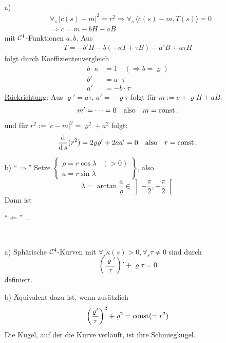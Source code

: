 \begin{beweis} \(\)
 \begin{enumerate}
  \item[a)] 
  \begin{align*}
  &\forall_s \, |c(s) - m|^2 = r^2 \Rightarrow \forall_s \, \langle c(s) - m, T(s) \rangle = 0 \\
  &\Rightarrow c = m - b H - a B
  \end{align*}
  mit \(\mathcal{C}^1\)-Funktionen \(a, b\). Aus
  \begin{align*}
   T = -b' H - b (-\kappa T + \tau B) - a' B + a \tau H
  \end{align*}
  folgt durch Koeffizientenvergleich
  \begin{align*}
   b \cdot \kappa &= 1 \quad (\Rightarrow b = \varrho) \\
   b' &= a \cdot \tau \\
   a' &= -b \cdot \tau
  \end{align*}
  \uline{Rückrichtung}: Aus \(\varrho' = a \tau, \, a' = -\varrho \tau\) folgt für \(m := c + \varrho H + a B\):
  \begin{align*}
   m' = \dots = 0 \quad \text{also}\quad m = \operatorname{const}.
  \end{align*}
  und für \(r^2 := |c-m|^2 = \varrho^2 + a^2\) folgt:
  \begin{align*}
   \frac{\operatorname{d}}{\operatorname{d} s} (r^2)= 2 \varrho \varrho' + 2 a a' = 0 \quad \text{also} \quad r = \operatorname{const}.
  \end{align*}
  \item[b)]
  "`\(\Rightarrow\)"' Setze \(\begin{Bmatrix}
                               \rho = r \cos \lambda &(> 0)\\
                               a = r \sin \lambda
                              \end{Bmatrix}\), also \[\lambda = \arctan \frac a\varrho \in \left] -\frac{\pi}2, + \frac{\pi}2\right[ \]
Dann ist  \par
"`\(\Leftarrow\)"' \(\dots\)
 \end{enumerate}

\end{beweis}

\begin{folgerung} \(\)
 \begin{enumerate}
  \item[a)] Sphärische \(\mathcal{C}^4\)-Kurven mit \(\forall_s \kappa(s) > 0, \forall_s \tau \ne 0\) sind durch
  \[
   \left(\frac{\varrho'}{\tau}\right)' + \varrho \tau = 0
  \]
  definiert.
  \item[b)] Äquivalent dazu ist, wenn zusätzlich 
  \[
   \left(\frac{\varrho'}{\tau}\right)^2 + \varrho^2 = \operatorname{const} (= r^2)
  \]
  Die Kugel, auf der die Kurve verläuft, ist ihre Schmiegkugel.
 \end{enumerate}
\end{folgerung}


